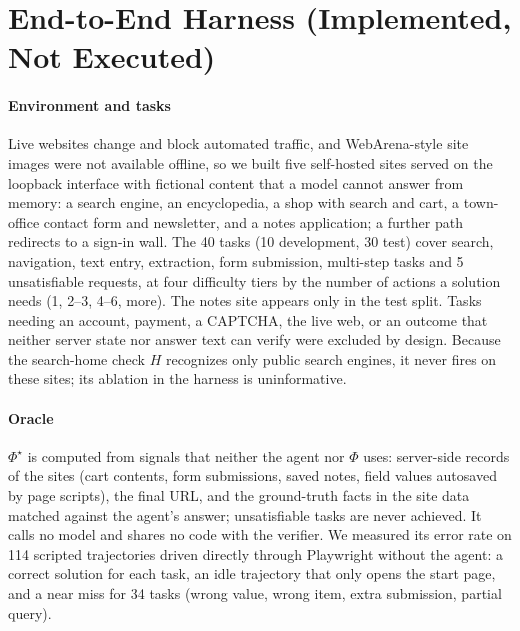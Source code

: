 \section{End-to-End Harness (Implemented, Not Executed)}
\label{sec:method-e2e-full}

\paragraph{Environment and tasks} Live websites change and block automated traffic, and WebArena-style site images were not available offline, so we built five self-hosted sites served on the loopback interface with fictional content that a model cannot answer from memory: a search engine, an encyclopedia, a shop with search and cart, a town-office contact form and newsletter, and a notes application; a further path redirects to a sign-in wall. The 40 tasks (10 development, 30 test) cover search, navigation, text entry, extraction, form submission, multi-step tasks and 5 unsatisfiable requests, at four difficulty tiers by the number of actions a solution needs (1, 2--3, 4--6, more). The notes site appears only in the test split. Tasks needing an account, payment, a CAPTCHA, the live web, or an outcome that neither server state nor answer text can verify were excluded by design. Because the search-home check $H$ recognizes only public search engines, it never fires on these sites; its ablation in the harness is uninformative.

\paragraph{Oracle} $\Phi^{\star}$ is computed from signals that neither the agent nor $\Phi$ uses: server-side records of the sites (cart contents, form submissions, saved notes, field values autosaved by page scripts), the final URL, and the ground-truth facts in the site data matched against the agent's answer; unsatisfiable tasks are never achieved. It calls no model and shares no code with the verifier. We measured its error rate on 114 scripted trajectories driven directly through Playwright without the agent: a correct solution for each task, an idle trajectory that only opens the start page, and a near miss for 34 tasks (wrong value, wrong item, extra submission, partial query).

